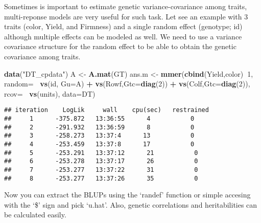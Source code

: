 \documentclass[]{article}
\newenvironment{Shaded}{\begin{snugshade}}{\end{snugshade}}
\newcommand{\KeywordTok}[1]{\textcolor[rgb]{0.13,0.29,0.53}{\textbf{#1}}}
\newcommand{\DataTypeTok}[1]{\textcolor[rgb]{0.13,0.29,0.53}{#1}}
\newcommand{\DecValTok}[1]{\textcolor[rgb]{0.00,0.00,0.81}{#1}}
\newcommand{\StringTok}[1]{\textcolor[rgb]{0.31,0.60,0.02}{#1}}
\newcommand{\OperatorTok}[1]{\textcolor[rgb]{0.81,0.36,0.00}{\textbf{#1}}}
\newcommand{\NormalTok}[1]{#1}
\begin{document}
Sometimes is important to estimate genetic variance-covariance among
traits, multi-reponse models are very useful for such task. Let see an
example with 3 traits (color, Yield, and Firmness) and a single random
effect (genotype; id) although multiple effects can be modeled as well.
We need to use a variance covariance structure for the random effect to
be able to obtain the genetic covariance among traits.

\begin{Shaded}
\begin{Highlighting}[]
\KeywordTok{data}\NormalTok{(}\StringTok{"DT_cpdata"}\NormalTok{)}
\NormalTok{A <-}\StringTok{ }\KeywordTok{A.mat}\NormalTok{(GT)}
\NormalTok{ans.m <-}\StringTok{ }\KeywordTok{mmer}\NormalTok{(}\KeywordTok{cbind}\NormalTok{(Yield,color)}\OperatorTok{~}\DecValTok{1}\NormalTok{,}
               \DataTypeTok{random=}\OperatorTok{~}\StringTok{ }\KeywordTok{vs}\NormalTok{(id, }\DataTypeTok{Gu=}\NormalTok{A)}
               \OperatorTok{+}\StringTok{ }\KeywordTok{vs}\NormalTok{(Rowf,}\DataTypeTok{Gtc=}\KeywordTok{diag}\NormalTok{(}\DecValTok{2}\NormalTok{))}
               \OperatorTok{+}\StringTok{ }\KeywordTok{vs}\NormalTok{(Colf,}\DataTypeTok{Gtc=}\KeywordTok{diag}\NormalTok{(}\DecValTok{2}\NormalTok{)),}
               \DataTypeTok{rcov=}\OperatorTok{~}\StringTok{ }\KeywordTok{vs}\NormalTok{(units),}
               \DataTypeTok{data=}\NormalTok{DT)}
\end{Highlighting}
\end{Shaded}

\begin{verbatim}
## iteration    LogLik     wall    cpu(sec)   restrained
##     1      -375.872   13:36:55      4           0
##     2      -291.932   13:36:59      8           0
##     3      -258.273   13:37:4      13           0
##     4      -253.459   13:37:8      17           0
##     5      -253.291   13:37:12      21           0
##     6      -253.278   13:37:17      26           0
##     7      -253.277   13:37:22      31           0
##     8      -253.277   13:37:26      35           0
\end{verbatim}

Now you can extract the BLUPs using the `randef' function or simple
accesing with the `\$' sign and pick `u.hat'. Also, genetic correlations
and heritabilities can be calculated easily.

\begin{Shaded}
\end{Shaded}
\end{document}
